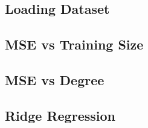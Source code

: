 \documentclass{article}
\begin{document}
\subsection{Loading Dataset}\label{appendix:4.1}


\subsection{MSE vs Training Size}\label{appendix:4.2}


\subsection{MSE vs Degree}\label{appendix:4.3}


\subsection{Ridge Regression}\label{appendix:4.4}

\end{document}
